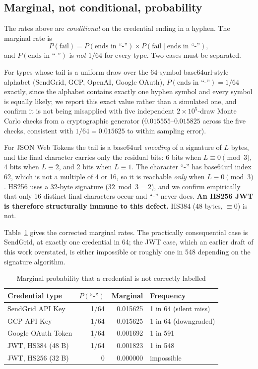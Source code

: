 \documentclass[journal]{IEEEtran}
\begin{document}
\subsection{Marginal, not conditional, probability}

The rates above are \emph{conditional} on the credential ending in a hyphen. The marginal rate is
\[
P(\text{fail}) = P(\text{ends in ``-''}) \times P(\text{fail} \mid \text{ends in ``-''}),
\]
and $P(\text{ends in ``-''})$ is \emph{not} $1/64$ for every type. Two cases must be separated.

For types whose tail is a uniform draw over the 64-symbol base64url-style alphabet (SendGrid, GCP, OpenAI, Google OAuth), $P(\text{ends in ``-''}) = 1/64$ exactly, since the alphabet contains exactly one hyphen symbol and every symbol is equally likely; we report this exact value rather than a simulated one, and confirm it is not being misapplied with five independent $2\times10^5$-draw Monte Carlo checks from a cryptographic generator ($0.015555$--$0.015825$ across the five checks, consistent with $1/64 = 0.015625$ to within sampling error).

For JSON Web Tokens the tail is a base64url \emph{encoding} of a signature of $L$ bytes, and the final character carries only the residual bits: 6 bits when $L \equiv 0 \pmod 3$, 4 bits when $L \equiv 2$, and 2 bits when $L \equiv 1$. The character ``-'' has base64url index 62, which is not a multiple of 4 or 16, so it is reachable \emph{only} when $L \equiv 0 \pmod 3$. HS256 uses a 32-byte signature ($32 \bmod 3 = 2$), and we confirm empirically that only 16 distinct final characters occur and ``-'' never does. \textbf{An HS256 JWT is therefore structurally immune to this defect.} HS384 (48 bytes, $\equiv 0$) is not.

Table~\ref{tab:marginal} gives the corrected marginal rates. The practically consequential case is SendGrid, at exactly one credential in 64; the JWT case, which an earlier draft of this work overstated, is either impossible or roughly one in 548 depending on the signature algorithm.

\begin{table}[t]
\centering
\caption{Marginal probability that a credential is not correctly labelled}
\label{tab:marginal}
\small
\setlength{\tabcolsep}{3.5pt}
\begin{tabular}{@{}lrrl@{}}
\toprule
Credential type & $P(\text{``-''})$ & Marginal & Frequency \\
\midrule
SendGrid API Key & 1/64 & 0.015625 & 1 in 64 (silent miss) \\
GCP API Key & 1/64 & 0.015625 & 1 in 64 (downgraded) \\
Google OAuth Token & 1/64 & 0.001692 & 1 in 591 \\
JWT, HS384 (48 B) & 1/64 & 0.001823 & 1 in 548 \\
JWT, HS256 (32 B) & 0 & 0.000000 & impossible \\
\bottomrule
\end{tabular}
\end{table}
\end{document}
